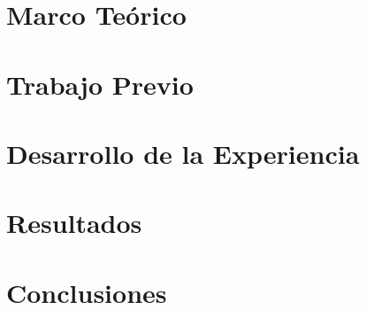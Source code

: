 \documentclass[12pt]{article}
\begin{document}
\section{Marco Teórico}


\newpage
\section{Trabajo Previo}


\newpage
\section{Desarrollo de la Experiencia}


\section{Resultados}


\newpage
\section{Conclusiones}


%



%
%
\end{document}

